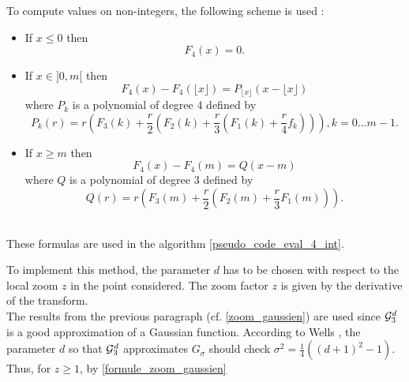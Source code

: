 
To compute values on non-integers, the following scheme is used :

\begin{itemize}
\item If $x\le 0$ then
\begin{equation}
\label{formula_nonint_integral_case1}
F_{4}(x)=0.
\end{equation}
\item If $x\in ]0 , m[$ then
\begin{equation}
\label{formula_nonint_integral_case2}
F_{4}(x)-F_{4}(\lfloor x \rfloor)=P_{\lfloor x \rfloor}(x-\lfloor x \rfloor)
\end{equation}
where $P_k$ is a polynomial of degree $4$ defined by
\begin{equation*}
P_k (r) =r \left( F_{3}(k) +\frac{r}{2} \left(F_{2}(k)+ \frac{r}{3}\left(F_{1}(k)+\frac{r}{4} f_{k}\right)\right)\right), k=0...m-1.
\end{equation*}
\item If $x\ge m$ then
\begin{equation}
\label{formula_nonint_integral_case3}
F_{4}(x)-F_{4}(m)=Q(x-m)
\end{equation}
where  $Q$ is a polynomial of degree 3 defined by
\begin{equation*}
Q(r)=r \left(F_{3}(m)+\frac{r}{2} \left( F_{2}(m) + \frac{r}{3} F_1 (m)\right)\right).
\end{equation*}\
\end{itemize}

These formulas are used in the algorithm \ref{pseudo_code_eval_4_int}.






\medbreak


To implement this method, the parameter $d$ has to be chosen with respect to the local zoom $z$ in the point considered. The zoom factor $z$ is given by the derivative of the transform.\\
The results from the previous paragraph (cf. \ref{zoom_gaussien}) are used since $\mathcal{G}_3^d$ is a good approximation of a Gaussian function. According to Wells \cite{wells1986efficient}, the parameter $d$ so that $\mathcal{G}_3^d$ approximates $G_\sigma$ should check $\sigma^2 = \frac 1 4 \left((d+1)^2-1\right)$. Thus, for $z \geq 1$, by \eqref{formule_zoom_gaussien}

